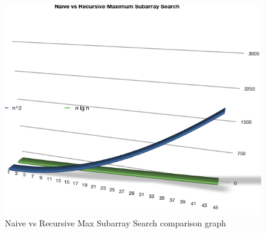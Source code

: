 \documentclass[11pt,letterpaper]{article}
\begin{document}
\begin{figure}[!h]

	\begin{center}
	\includegraphics[width=120mm]{images/ss_graph}
	\end{center}

\caption{Naive vs Recursive Max Subarray Search comparison graph}
\label{find_arr_compare_graph}
\end{figure}
\end{document}
